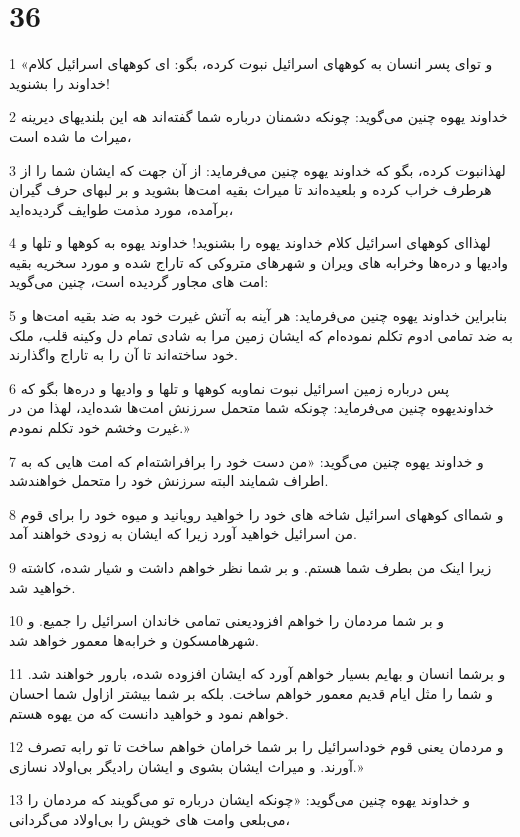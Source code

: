 \chapter{36}

\par 1 «و تو‌ای پسر انسان به کوههای اسرائیل نبوت کرده، بگو: ای کوههای اسرائیل کلام خداوند را بشنوید!
\par 2 خداوند یهوه چنین می‌گوید: چونکه دشمنان درباره شما گفته‌اند هه این بلندیهای دیرینه میراث ما شده است،
\par 3 لهذانبوت کرده، بگو که خداوند یهوه چنین می‌فرماید: از آن جهت که ایشان شما را از هرطرف خراب کرده و بلعیده‌اند تا میراث بقیه امت‌ها بشوید و بر لبهای حرف گیران برآمده، مورد مذمت طوایف گردیده‌اید،
\par 4 لهذا‌ای کوههای اسرائیل کلام خداوند یهوه را بشنوید! خداوند یهوه به کوهها و تلها و وادیها و دره‌ها وخرابه های ویران و شهرهای متروکی که تاراج شده و مورد سخریه بقیه امت های مجاور گردیده است، چنین می‌گوید:
\par 5 بنابراین خداوند یهوه چنین می‌فرماید: هر آینه به آتش غیرت خود به ضد بقیه امت‌ها و به ضد تمامی ادوم تکلم نموده‌ام که ایشان زمین مرا به شادی تمام دل وکینه قلب، ملک خود ساخته‌اند تا آن را به تاراج واگذارند.
\par 6 پس درباره زمین اسرائیل نبوت نماوبه کوهها و تلها و وادیها و دره‌ها بگو که خداوندیهوه چنین می‌فرماید: چونکه شما متحمل سرزنش امت‌ها شده‌اید، لهذا من در غیرت وخشم خود تکلم نمودم.»
\par 7 و خداوند یهوه چنین می‌گوید: «من دست خود را برافراشته‌ام که امت هایی که به اطراف شمایند البته سرزنش خود را متحمل خواهندشد.
\par 8 و شما‌ای کوههای اسرائیل شاخه های خود را خواهید رویانید و میوه خود را برای قوم من اسرائیل خواهید آورد زیرا که ایشان به زودی خواهند آمد.
\par 9 زیرا اینک من بطرف شما هستم. و بر شما نظر خواهم داشت و شیار شده، کاشته خواهید شد.
\par 10 و بر شما مردمان را خواهم افزودیعنی تمامی خاندان اسرائیل را جمیع. و شهرهامسکون و خرابه‌ها معمور خواهد شد.
\par 11 و برشما انسان و بهایم بسیار خواهم آورد که ایشان افزوده شده، بارور خواهند شد. و شما را مثل ایام قدیم معمور خواهم ساخت. بلکه بر شما بیشتر ازاول شما احسان خواهم نمود و خواهید دانست که من یهوه هستم.
\par 12 و مردمان یعنی قوم خوداسرائیل را بر شما خرامان خواهم ساخت تا تو رابه تصرف آورند. و میراث ایشان بشوی و ایشان رادیگر بی‌اولاد نسازی.»
\par 13 و خداوند یهوه چنین می‌گوید: «چونکه ایشان درباره تو می‌گویند که مردمان را می‌بلعی وامت های خویش را بی‌اولاد می‌گردانی،
